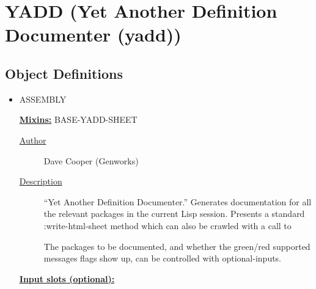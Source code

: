 \documentclass [11pt]{book}
\begin{document}
\section{YADD (Yet Another Definition Documenter (yadd))}

\label{sec:yadd(yetanotherdefinitiondocumenter(yadd))}





\subsection{Object Definitions}

\label{subsec:objectdefinitions}



\begin{itemize}

\item {}ASSEMBLY


\textbf{
\underline{Mixins:}} BASE-YADD-SHEET





\begin{description}

\item [
\underline{Author}]


Dave Cooper (Genworks)



\item [
\underline{Description}]


``Yet Another Definition Documenter.'' Generates 
documentation for all the relevant packages in the current Lisp session. Presents a 
standard :write-html-sheet method which can also be crawled with a call to 


The packages to be documented, and whether the green/red supported 
messages flags show up, can be controlled with optional-inputs.



\end{description}








\textbf{
\underline{Input slots (optional):}}

\begin{description}


\end{description}
\end{itemize}
\end{document}

